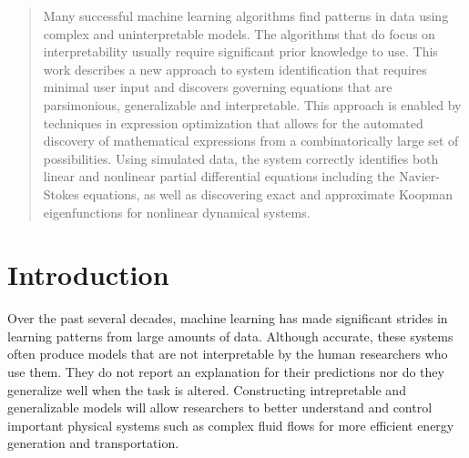 \documentclass{article}
\begin{document}
\begin{abstract}
Many successful machine learning algorithms find patterns in data using complex and uninterpretable models. The algorithms that do focus on interpretability usually require significant prior knowledge to use. This work describes a new approach to system identification that requires minimal user input and discovers governing equations that are parsimonious, generalizable and interpretable. This approach is enabled by techniques in expression optimization that allows for the automated discovery of mathematical expressions from a combinatorically large set of possibilities. Using simulated data, the system correctly identifies both linear and nonlinear partial differential equations including the Navier-Stokes equations, as well as discovering exact and approximate Koopman eigenfunctions for nonlinear dynamical systems. 
\end{abstract}

\section{Introduction}
\label{introduction}

Over the past several decades, machine learning has made significant strides in learning patterns from large amounts of data. Although accurate, these systems often produce models that are not interpretable by the human researchers who use them. They do not report an explanation for their predictions nor do they generalize well when the task is altered. Constructing intrepretable and generalizable models will allow researchers to better understand and control important physical systems such as complex fluid flows for more efficient energy generation and transportation.

\end{document}
